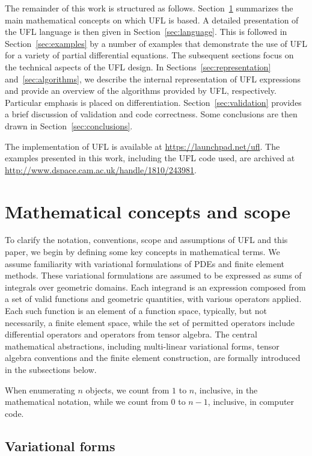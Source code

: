 \documentclass[prodmode,acmtoms]{acmsmall}
\begin{document}
The remainder of this work is structured as
follows. Section~\ref{sec:concepts} summarizes the main mathematical
concepts on which UFL is based. A detailed presentation of the UFL
language is then given in Section~\ref{sec:language}. This is followed
in Section~\ref{sec:examples} by a number of examples that demonstrate
the use of UFL for a variety of partial differential equations. The
subsequent sections focus on the technical aspects of the UFL design. In
Sections~\ref{sec:representation} and~\ref{sec:algorithms}, we describe
the internal representation of UFL expressions and provide an overview
of the algorithms provided by UFL, respectively. Particular emphasis
is placed on differentiation.  Section~\ref{sec:validation} provides a
brief discussion of validation and code correctness. Some conclusions
are then drawn in Section~\ref{sec:conclusions}.

The implementation of UFL is available at
\url{https://launchpad.net/ufl}. The examples presented
in this work, including the UFL code used, are archived at
\url{http://www.dspace.cam.ac.uk/handle/1810/243981}.

\section{Mathematical concepts and scope}
\label{sec:concepts}

To clarify the notation, conventions, scope and assumptions of UFL and
this paper, we begin by defining some key concepts in mathematical
terms. We assume familiarity with variational formulations of PDEs and
finite element methods.
These variational formulations are assumed to be expressed as sums of
integrals over geometric domains. Each integrand is an expression
composed from a set of valid functions and geometric quantities, with
various operators applied. Each such function is an element of a
function space, typically, but not necessarily, a finite element
space, while the set of permitted operators include differential
operators and operators from tensor algebra. The central mathematical
abstractions, including multi-linear variational forms, tensor algebra
conventions and the finite element construction, are formally
introduced in the subsections below.

When enumerating $n$ objects, we count from $1$ to $n$, inclusive, in
the mathematical notation, while we count from $0$ to $n-1$,
inclusive, in computer code.

\subsection{Variational forms}
\label{sec:variationalforms}
\end{document}
